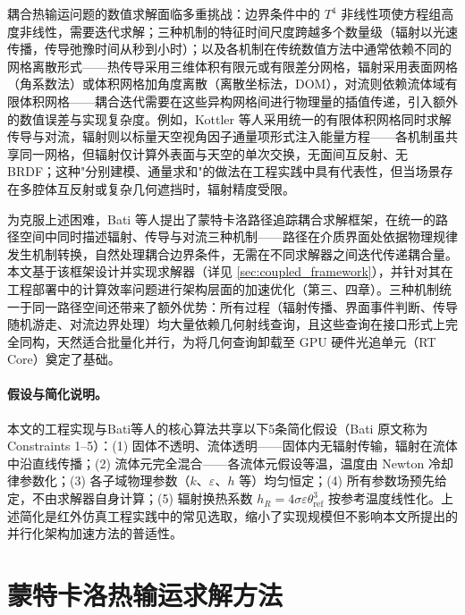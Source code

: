 耦合热输运问题的数值求解面临多重挑战：边界条件中的 $T^4$ 非线性项使方程组高度非线性，需要迭代求解；三种机制的特征时间尺度跨越多个数量级（辐射以光速传播，传导弛豫时间从秒到小时）；以及各机制在传统数值方法中通常依赖不同的网格离散形式——热传导采用三维体积有限元或有限差分网格\cite{bergmanFundamentalsHeatMass2011}，辐射采用表面网格（角系数法）或体积网格加角度离散（离散坐标法，DOM\cite{fivelandDiscreteOrdinatesSolutions1984}），对流则依赖流体域有限体积网格——耦合迭代需要在这些异构网格间进行物理量的插值传递，引入额外的数值误差与实现复杂度。例如，Kottler 等人\cite{kottlerPhysicallybasedThermalSimulation2019}采用统一的有限体积网格同时求解传导与对流，辐射则以标量天空视角因子通量项形式注入能量方程——各机制虽共享同一网格，但辐射仅计算外表面与天空的单次交换，无面间互反射、无 BRDF；这种"分别建模、通量求和"的做法在工程实践中具有代表性，但当场景存在多腔体互反射或复杂几何遮挡时，辐射精度受限。

为克服上述困难，Bati 等人\cite{batiCouplingConductionConvection2023}提出了蒙特卡洛路径追踪耦合求解框架，在统一的路径空间中同时描述辐射、传导与对流三种机制——路径在介质界面处依据物理规律发生机制转换，自然处理耦合边界条件，无需在不同求解器之间迭代传递耦合量。本文基于该框架设计并实现求解器（详见 \ref{sec:coupled_framework}），并针对其在工程部署中的计算效率问题进行架构层面的加速优化（第三、四章）。三种机制统一于同一路径空间还带来了额外优势：所有过程（辐射传播、界面事件判断、传导随机游走、对流边界处理）均大量依赖几何射线查询，且这些查询在接口形式上完全同构，天然适合批量化并行，为将几何查询卸载至 GPU 硬件光追单元（RT Core）奠定了基础。

\paragraph{假设与简化说明。}
本文的工程实现与Bati等人\cite{batiCouplingConductionConvection2023}的核心算法共享以下5条简化假设（Bati 原文称为 Constraints 1--5）：(1) 固体不透明、流体透明——固体内无辐射传输，辐射在流体中沿直线传播；(2) 流体元完全混合——各流体元假设等温，温度由 Newton 冷却律参数化；(3) 各子域物理参数（$k$、$\varepsilon$、$h$ 等）均匀恒定；(4) 所有参数场预先给定，不由求解器自身计算；(5) 辐射换热系数 $h_R = 4\sigma\varepsilon\theta_\text{ref}^3$ 按参考温度线性化。上述简化是红外仿真工程实践中的常见选取\cite{howellThermalRadiationHeat2021}，缩小了实现规模但不影响本文所提出的并行化架构加速方法的普适性。

\section{蒙特卡洛热输运求解方法}

